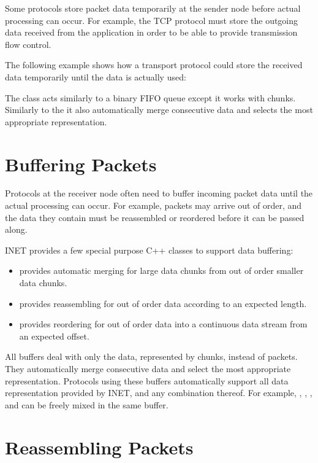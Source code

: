 Some protocols store packet data temporarily at the sender node before actual
processing can occur. For example, the TCP protocol must store the outgoing data
received from the application in order to be able to provide transmission flow
control.

The following example shows how a transport protocol could store the received
data temporarily until the data is actually used:


The  class acts similarly to a binary FIFO queue except it
works with chunks. Similarly to the  it also automatically
merge consecutive data and selects the most appropriate representation.

\section{Buffering Packets}

Protocols at the receiver node often need to buffer incoming packet data until
the actual processing can occur. For example, packets may arrive out of order,
and the data they contain must be reassembled or reordered before it can be
passed along.

INET provides a few special purpose C++ classes to support data buffering:
\begin{itemize}
	\item {} provides automatic merging for large data
	chunks from out of order smaller data chunks.
	\item {} provides reassembling for out of order data
	according to an expected length.
	\item {} provides reordering for out of order data into a
	continuous data stream from an expected offset.
\end{itemize}

All buffers deal with only the data, represented by chunks, instead of packets.
They automatically merge consecutive data and select the most appropriate
representation. Protocols using these buffers automatically support all data
representation provided by INET, and any combination thereof. For example,
, , , and
 can be freely mixed in the same buffer.

\section{Reassembling Packets}


